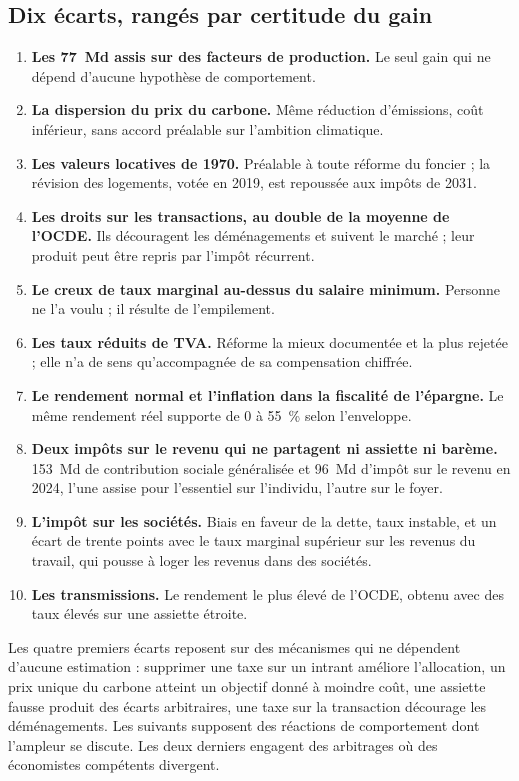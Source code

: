 \documentclass[11pt,a4paper]{article}
\providecommand{\euro}{\texteuro}
\begin{document}
\subsection{Dix écarts, rangés par certitude du gain}

\begin{enumerate}[leftmargin=1.5em,itemsep=0.35em]
\item \textbf{Les 77~Md\euro{} assis sur des facteurs de production.} Le seul gain qui ne dépend
d'aucune hypothèse de comportement.
\item \textbf{La dispersion du prix du carbone.} Même réduction d'émissions, coût inférieur, sans
accord préalable sur l'ambition climatique.
\item \textbf{Les valeurs locatives de 1970.} Préalable à toute réforme du foncier ; la révision des
logements, votée en 2019, est repoussée aux impôts de 2031.
\item \textbf{Les droits sur les transactions, au double de la moyenne de l'OCDE.} Ils découragent les
déménagements et suivent le marché ; leur produit peut être repris par l'impôt récurrent.
\item \textbf{Le creux de taux marginal au-dessus du salaire minimum.} Personne ne l'a voulu ; il
résulte de l'empilement.
\item \textbf{Les taux réduits de TVA.} Réforme la mieux documentée et la plus rejetée ; elle n'a de
sens qu'accompagnée de sa compensation chiffrée.
\item \textbf{Le rendement normal et l'inflation dans la fiscalité de l'épargne.} Le même rendement
réel supporte de 0 à 55~\% selon l'enveloppe.
\item \textbf{Deux impôts sur le revenu qui ne partagent ni assiette ni barème.} 153~Md\euro{} de
contribution sociale généralisée et 96~Md\euro{} d'impôt sur le revenu en 2024, l'une assise pour
l'essentiel sur l'individu, l'autre sur le foyer.
\item \textbf{L'impôt sur les sociétés.} Biais en faveur de la dette, taux instable, et un écart de
trente points avec le taux marginal supérieur sur les revenus du travail, qui pousse à loger les
revenus dans des sociétés.
\item \textbf{Les transmissions.} Le rendement le plus élevé de l'OCDE, obtenu avec des taux élevés
sur une assiette étroite.
\end{enumerate}

Les quatre premiers écarts reposent sur des mécanismes qui ne dépendent d'aucune estimation : supprimer une taxe sur un
intrant améliore l'allocation, un prix unique du carbone atteint un objectif donné à moindre coût,
une assiette fausse produit des écarts arbitraires, une taxe sur la transaction décourage les
déménagements. Les suivants supposent des réactions de comportement dont l'ampleur se discute. Les deux
derniers engagent des arbitrages où des économistes compétents divergent.
\end{document}

